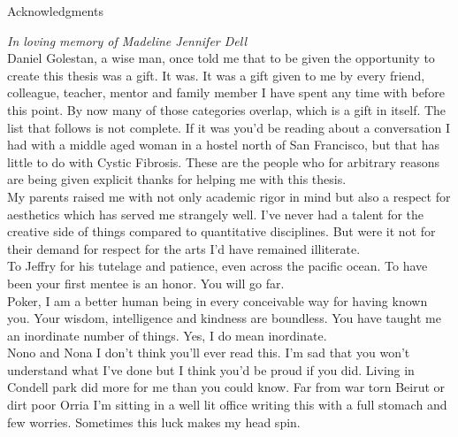 \newpage

\vspace{3in}

\begin{center}
\begin{Large}
\begin{bfseries}
Acknowledgments
\end{bfseries}
\end{Large}
\end{center}

\vspace{0.5in}


\vspace{1.0in}
\textit {In loving memory of Madeline Jennifer Dell} \\

\newline Daniel Golestan, a wise man, once told me that to be given the opportunity to create this thesis was a gift. It was. It was a gift given to me by every friend, colleague, teacher, mentor and family member I have spent any time with before this point. By now many of those categories overlap, which is a gift in itself. The list that follows is not complete. If it was you'd be reading about a conversation I had with a middle aged woman in a hostel north of San Francisco, but that has little to do with Cystic Fibrosis. These are the people who for arbitrary reasons are being given explicit thanks for helping me with this thesis. \\

My parents raised me with not only academic rigor in mind but also a respect for aesthetics which has served me strangely well. I've never had a talent for the creative side of things compared to quantitative disciplines. But were it not for their demand for respect for the arts I'd have remained illiterate. \\

To Jeffry for his tutelage and patience, even across the pacific ocean. To have been your first mentee is an honor. You will go far. \\

Poker, I am a better human being in every conceivable way for having known you. Your wisdom, intelligence and kindness are boundless. You have taught me an inordinate number of things. Yes, I do mean inordinate. \\

Nono and Nona I don't think you'll ever read this. I'm sad that you won't understand what I've done but I think you'd be proud if you did. Living in Condell park did more for me than you could know. Far from war torn Beirut or dirt poor Orria I'm sitting in a well lit office writing this with a full stomach and few worries. Sometimes this luck makes my head spin. \\

